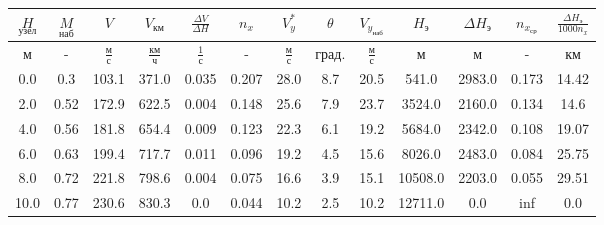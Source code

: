 \begin{tabular}{|c|c|c|c|c|c|c|c|c|c|c|c|c|}
\hline
$\underset{узел}{H}$ & $\underset{наб}{M}$ & $V$ & $V_{км}$ & $\frac{\Delta V}{\Delta H}$ & $n_x$ & $V_{y}^*$ & $\theta$ & $V_{y_{наб}}$ & $H_э$ & $\Delta H_э$ & $n_{x_{ср}}$ & $\frac{\Delta H_{э}}{1000 n_x}$ \\ 
\hline
м & - & $\frac{м}{с}$ & $\frac{км}{ч}$ & $\frac{1}{с}$ & - & $\frac{м}{с}$ & $град.$ & $\frac{м}{с}$ & м & м & - & км \\ 
\hline
0.0 & 0.3 & 103.1 & 371.0 & 0.035 & 0.207 & 28.0 & 8.7 & 20.5 & 541.0 & 2983.0 & 0.173 & 14.42 \\ 
\hline
2.0 & 0.52 & 172.9 & 622.5 & 0.004 & 0.148 & 25.6 & 7.9 & 23.7 & 3524.0 & 2160.0 & 0.134 & 14.6 \\ 
\hline
4.0 & 0.56 & 181.8 & 654.4 & 0.009 & 0.123 & 22.3 & 6.1 & 19.2 & 5684.0 & 2342.0 & 0.108 & 19.07 \\ 
\hline
6.0 & 0.63 & 199.4 & 717.7 & 0.011 & 0.096 & 19.2 & 4.5 & 15.6 & 8026.0 & 2483.0 & 0.084 & 25.75 \\ 
\hline
8.0 & 0.72 & 221.8 & 798.6 & 0.004 & 0.075 & 16.6 & 3.9 & 15.1 & 10508.0 & 2203.0 & 0.055 & 29.51 \\ 
\hline
10.0 & 0.77 & 230.6 & 830.3 & 0.0 & 0.044 & 10.2 & 2.5 & 10.2 & 12711.0 & 0.0 & inf & 0.0 \\ 
\hline
\end{tabular}